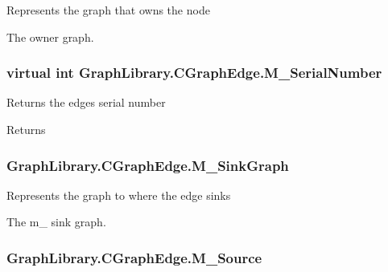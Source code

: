 Represents the graph that owns the node 

The owner graph. \hypertarget{class_graph_library_1_1_c_graph_edge_a4a000bcf04e549dc33e522ace7facc63}{}
\subsubsection[{M\+\_\+\+Serial\+Number}]{\setlength{\rightskip}{0pt plus 5cm}virtual int Graph\+Library.\+C\+Graph\+Edge.\+M\+\_\+\+Serial\+Number\hspace{0.3cm}{\ttfamily [get]}}\label{class_graph_library_1_1_c_graph_edge_a4a000bcf04e549dc33e522ace7facc63}


Returns the edge\textquotesingle{}s serial number 

\begin{DoxyReturn}{Returns}

\end{DoxyReturn}
\hypertarget{class_graph_library_1_1_c_graph_edge_a0548b68a08517457f2bd5fbec3eb0628}{}
\subsubsection[{M\+\_\+\+Sink\+Graph}]{ Graph\+Library.\+C\+Graph\+Edge.\+M\+\_\+\+Sink\+Graph\hspace{0.3cm}{\ttfamily [get]}}\label{class_graph_library_1_1_c_graph_edge_a0548b68a08517457f2bd5fbec3eb0628}


Represents the graph to where the edge sinks 

The m\+\_\+ sink graph. \hypertarget{class_graph_library_1_1_c_graph_edge_a79ff7b9982b737ed66755c8baf51a31a}{}
\subsubsection[{M\+\_\+\+Source}]{ Graph\+Library.\+C\+Graph\+Edge.\+M\+\_\+\+Source\hspace{0.3cm}{\ttfamily [get]}}\label{class_graph_library_1_1_c_graph_edge_a79ff7b9982b737ed66755c8baf51a31a}


